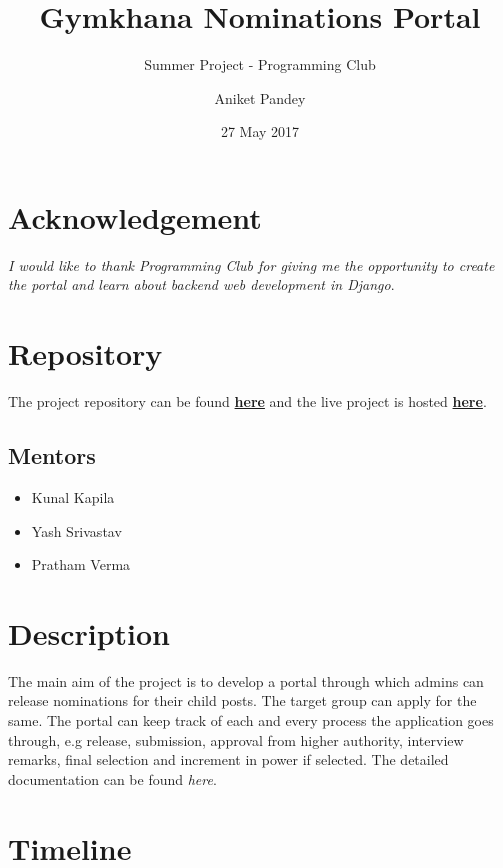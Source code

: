\documentclass[12pt,a4paper]{scrartcl}
\title{\textbf{Gymkhana Nominations Portal}}
\subtitle{Summer Project - Programming Club}
\date{27 May 2017}
\author{Aniket Pandey}
\begin{document}
\maketitle

\section{Acknowledgement}
\textit{I would like to thank Programming Club for giving me the opportunity to create the portal and learn about backend web development in Django}.

\section{Repository}
The project repository can be found \textbf{\href{https://github.com/SummerCamp17/Gymkhana-Nominations}{here}} and the live project is hosted \textbf{\href{https://gymkhana.pythonanywhere.com}{here}}.

\subsection{Mentors}
\begin{itemize}
	\item Kunal Kapila
	\item Yash Srivastav
	\item Pratham Verma
\end{itemize}


\section{Description}
The main aim of the project is to develop a portal through which admins can release nominations for their child posts. The target group can apply for the same. The portal can keep track of each and every process the application goes through, e.g release, submission, approval from higher authority, interview remarks, final selection and increment in power if selected. The detailed documentation can be found \textit{here}. 

\section{Timeline}
\end{document}
